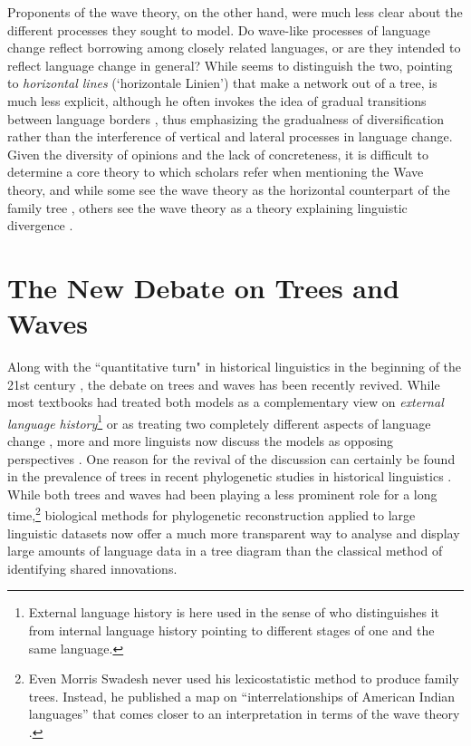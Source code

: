 \documentclass[svgnames,12pt]{scrartcl}
\begin{document}
{Proponents of the
wave theory, on the other hand, were much less clear about the different processes they sought to
model. Do wave-like processes of language change reflect borrowing among closely related languages,
or are they intended to reflect language change in general? While \citet{Schuchardt1870} seems to distinguish
the two, pointing to \emph{horizontal lines} (`{horizontale Linien}') that make a network out of a
tree, \citet{Schmidt1872} is much less explicit, although he often invokes the idea of gradual
transitions between language borders \citep[200]{Schmidt1875}, thus emphasizing the gradualness of
diversification rather than the interference of vertical and lateral processes in language change.
Given the diversity of opinions and the lack of concreteness, it is
difficult to determine a core theory to which scholars refer when mentioning the Wave theory, and
while some see the wave theory as the horizontal counterpart of the family tree \citep[74]{Baxter2006a},
others see the wave theory as a theory explaining linguistic divergence
\citep[188-191]{Campbell1999}.

\section{The New Debate on Trees and Waves}
Along with the ``quantitative turn" in historical linguistics in the beginning of the 21st century
\citep[209f]{List2014d}, the debate on trees and waves has been recently revived. While most textbooks had
treated both models as a complementary view on \emph{external language history}\footnote{External
language history is here used in the sense of \citet[179-290]{Gabelentz1891} who distinguishes it from
internal language history pointing to different stages of one and the same language.}
\citep{Lehmann1992,Anttila1972} or as treating two completely different aspects of language change
\citep{Campbell1999}, more and more linguists now  discuss the models as opposing perspectives
\citep{Heggarty2010,Francois2014}. One reason for the revival of the discussion can certainly be
found in the prevalence of trees in recent phylogenetic studies in historical linguistics
\citep{Gray2003,Atkinson2006,Ringe2002,Pagel2009}. While both trees and waves had been playing a less
prominent role for a long time,\footnote{Even Morris Swadesh never used his lexicostatistic method
to produce family trees. Instead, he published a map on ``interrelationships of American Indian
languages'' that comes closer to an interpretation in terms of the wave theory
\citep[23]{Swadesh1959}.} biological methods for phylogenetic reconstruction applied to large
linguistic datasets now offer a much more transparent way to analyse and display large amounts of
language data in a tree diagram than the classical method of identifying shared innovations.
 
}
\end{document}
